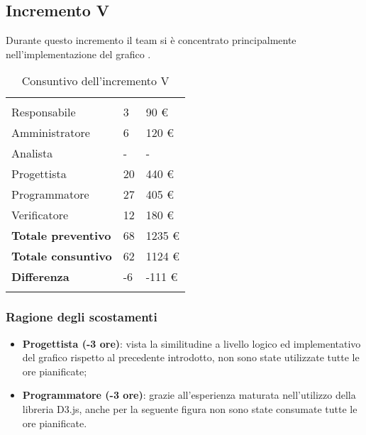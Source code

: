 \subsection{Incremento V}
Durante questo incremento il team si è concentrato principalmente nell'implementazione del grafico .
{
\setlength\arrayrulewidth{1pt}
\begin{longtable}{ C{4cm} C{3cm} C{3.5cm}} 
 	 &
 	 &
 	 \\
 	
 	Responsabile & 3 & 90 € \\
 	Amministratore & 6 & 120 €\\
 	Analista & - & - \\
 	Progettista & 20  & 440 € \\
 	Programmatore & 27  & 405 € \\
 	Verificatore & 12 & 180 €\\
 	
	\hline 	
 	
 	\textbf{Totale preventivo} &
	68 &
 	1235 € \\		
 	
 	\textbf{Totale consuntivo} &
	62 &
 	1124 € \\	
 	
 	\textbf{Differenza} &
	-6 &
 	-111 € \\	
 	
 	\caption{Consuntivo dell'incremento V}
\end{longtable}
}

\subsubsection{Ragione degli scostamenti}

\begin{itemize}
\item \textbf{Progettista (-3 ore)}: vista la similitudine a livello logico ed implementativo del grafico rispetto al precedente introdotto, non sono state utilizzate tutte le ore pianificate;
\item \textbf{Programmatore (-3 ore)}: grazie all'esperienza maturata nell'utilizzo della libreria D3.js, anche per la seguente figura non sono state consumate tutte le ore pianificate.
\end{itemize}

